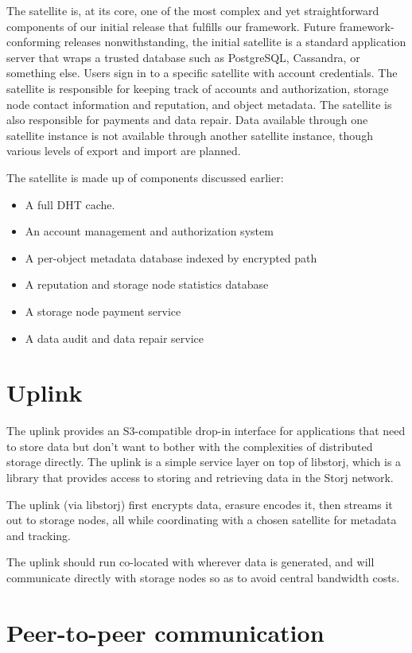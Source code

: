 \documentclass[11pt,fleqn,openany]{book}
\begin{document}
The satellite is, at its core, one of the most complex and yet
straightforward components of our initial release that fulfills our framework.
Future framework-conforming releases nonwithstanding, the initial satellite
is a standard application server that wraps a trusted database such as
PostgreSQL, Cassandra, or something else. Users sign in to a specific
satellite with account credentials. The satellite is responsible for
keeping track of accounts and authorization, storage node contact information
and
reputation, and object metadata. The satellite is also responsible for
payments and data repair. Data available through one satellite instance is
not available through another satellite instance, though various levels of
export and import are planned.

The satellite is made up of components discussed earlier:

\begin{itemize}
\item A full DHT cache.
\item An account management and authorization system
\item A per-object metadata database indexed by encrypted path
\item A reputation and storage node statistics database
\item A storage node payment service
\item A data audit and data repair service
\end{itemize}

\section{Uplink}

The uplink provides an S3-compatible drop-in interface for applications that
need to store data but don't want to bother with the complexities of distributed
storage directly. The uplink is a simple service layer on top of libstorj,
which is a library that provides access to storing and retrieving data in the
Storj network.

The uplink (via libstorj) first encrypts data, erasure encodes it, then
streams it out to storage nodes, all while coordinating with a chosen satellite
for metadata and tracking.

The uplink should run co-located with wherever data is generated, and will
communicate directly with storage nodes so as to avoid central bandwidth costs.

\section{Peer-to-peer communication}
\end{document}
